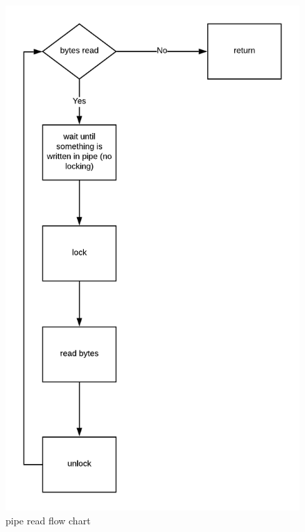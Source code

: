 \begin{figure}[htp]
\centering
\includegraphics[scale=0.7]{figures/pipe_read.png}
\caption{pipe read flow chart\label{fig4_6}}
\end{figure}


